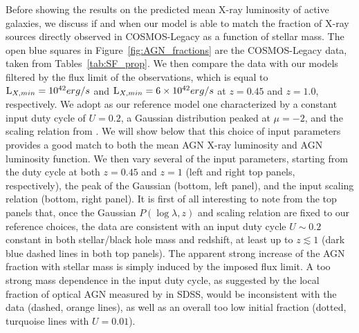 Before showing the results on the predicted mean X-ray luminosity of active galaxies, we discuss if and when our model is able to match the fraction of X-ray sources directly observed in COSMOS-Legacy as a function of stellar mass. The open blue squares in Figure~\ref{fig:AGN_fractions} are the COSMOS-Legacy data, taken from Tables~\ref{tab:SF_prop}. We then compare the data with our models filtered by the flux limit of the observations, which is equal to ${\rm L}_{X,min}=10^{42}erg/s$ and ${\rm L}_{X,min}=6\times10^{42}erg/s$ at $z=0.45$ and $z=1.0$, respectively. We adopt as our reference model one characterized by a constant input duty cycle of $U=0.2$, a Gaussian distribution peaked at $\mu=-2$, and the \MBHMS{} scaling relation from \cite{2015ApJ...813...82R}. We will show below that this choice of input parameters provides a good match to both the mean AGN X-ray luminosity and AGN luminosity function. We then vary several of the input parameters, starting from the duty cycle at both $z=0.45$ and $z=1$ (left and right top panels, respectively), the peak of the Gaussian \PLz (bottom, left panel), and the input \MBHMS{} scaling relation (bottom, right panel). It is first of all interesting to note from the top panels that, once the Gaussian $P(\log \lambda,z)$ and \MBHMS scaling relation are fixed to our reference choices, the data are consistent with an input duty cycle $U\sim0.2$ constant in both stellar/black hole mass and redshift, at least up to $z\lesssim 1$ (dark blue dashed lines in both top panels). The apparent strong increase of the AGN fraction with stellar mass is simply induced by the imposed flux limit. A too strong mass dependence in the input duty cycle, as suggested by the local fraction of optical AGN measured by \citet{2019MNRAS.488...89M} in SDSS, would be inconsistent with the data (dashed, orange lines), as well as an overall too low initial fraction (dotted, turquoise lines with $U=0.01$). 

